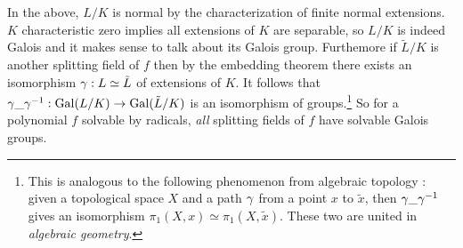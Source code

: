 \documentclass{article}
\begin{document}
\begin{rmk}
  In the above,
  $L / K$ is normal by the characterization of finite normal extensions.
  $K$ characteristic zero implies all extensions of $K$ are separable, 
  so $L / K$ is indeed Galois and it makes sense to talk about its Galois group.
  Furthemore if $\tilde{L} / K$ is another splitting field of $f$ then
  by the embedding theorem there exists an isomorphism $\gamma : L \simeq \tilde{L}$
  of extensions of $K$.
  It follows that $\gamma \_ \gamma^{-1} : \operatorname{Gal}(L / K) \to \operatorname{Gal}(\tilde{L} / K)$
  is an isomorphism of groups.\footnote{
    This is analogous to the following phenomenon from algebraic topology : 
    given a topological space $X$ and a path $\gamma$ from
    a point $x$ to $\tilde{x}$,
    then $\gamma \_ \gamma^{-1}$ gives an isomorphism 
    $\pi_1(X , x) \simeq \pi_1(X , \tilde{x})$.
    These two are united in \emph{algebraic geometry}.
  }
  So for a polynomial $f$ solvable by radicals,
  \emph{all} splitting fields of $f$ have solvable Galois groups.
\end{rmk}
\end{document}
